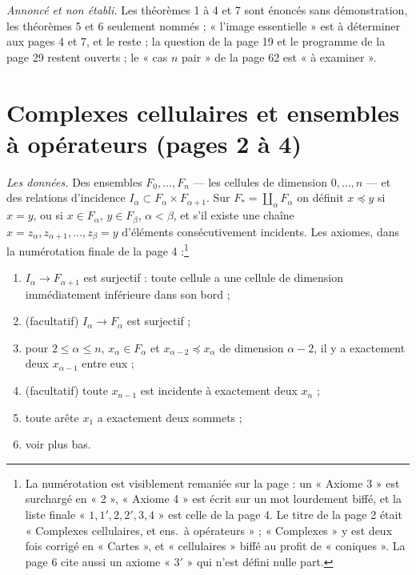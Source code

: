 \documentclass[11pt,a4paper]{article}
\begin{document}
\emph{Annoncé et non établi.} Les théorèmes 1 à 4 et 7
sont énoncés sans démonstration, les théorèmes 5 et 6 seulement nommés ;
« l'image essentielle » est à déterminer aux pages 4 et 7, et le reste ; la
question de la page 19 et le programme de la page 29 restent ouverts ; le
« cas $n$ pair » de la page 62 est « à examiner ».

\section*{Complexes cellulaires et ensembles à opérateurs (pages 2 à 4)}

\emph{Les données.} Des ensembles $F_0, \ldots, F_n$ --- les cellules de
dimension $0, \ldots, n$ --- et des relations d'incidence $I_\alpha \subset
F_\alpha \times F_{\alpha+1}$. Sur $F_* = \coprod_\alpha F_\alpha$ on définit
$x \preceq y$ si $x = y$, ou si $x \in F_\alpha$, $y \in F_\beta$, $\alpha <
\beta$, et s'il existe une chaîne $x = z_\alpha, z_{\alpha+1}, \ldots,
z_\beta = y$ d'éléments consécutivement incidents. Les axiomes, dans la
numérotation finale de la page 4 :\footnote{La numérotation est visiblement
remaniée sur la page : un « Axiome 3 » est surchargé en « 2 », « Axiome 4 »
est écrit sur un mot lourdement biffé, et la liste finale « $1, 1', 2, 2', 3,
4$ » est celle de la page 4. Le titre de la page 2 était « Complexes
cellulaires, et ens.\ à opérateurs » ; « Complexes » y est deux fois corrigé
en « Cartes », et « cellulaires » biffé au profit de « coniques ». La page 6
cite aussi un axiome « $3'$ » qui n'est défini nulle part.}

\begin{enumerate}
  \item[1.] $I_\alpha \to F_{\alpha+1}$ est surjectif : toute cellule a une
  cellule de dimension immédiatement inférieure dans son bord ;
  \item[1'.] (facultatif) $I_\alpha \to F_\alpha$ est surjectif ;
  \item[2.] pour $2 \leqslant \alpha \leqslant n$, $x_\alpha \in F_\alpha$ et
  $x_{\alpha-2} \preceq x_\alpha$ de dimension $\alpha - 2$, il y a exactement
  deux $x_{\alpha-1}$ entre eux ;
  \item[2'.] (facultatif) toute $x_{n-1}$ est incidente à exactement deux
  $x_n$ ;
  \item[3.] toute arête $x_1$ a exactement deux sommets ;
  \item[4.] voir plus bas.
\end{enumerate}
\end{document}
